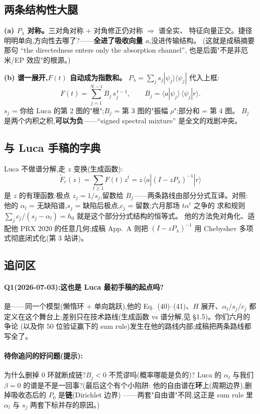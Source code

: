 \documentclass[11pt]{article}
\newcommand{\ket}[1]{|#1\rangle}
\newcommand{\bra}[1]{\langle#1|}
\begin{document}
\subsection{两条结构性大腿}
\textbf{(a) $P_\lambda$ 对称。}三对角对称 $+$ 对角修正仍对称 $\Rightarrow$ 谱全实、
特征向量正交。捷径明明单向,方向性去哪了?——\textbf{全进了吸收向量 $a$},没进传输结构。
(这就是成稿摘要那句 ``the directedness enters only the absorption channel'',
也是后面"不是非厄米/EP 效应"的根源。)

\textbf{(b) 谱一展开,$F(t)$ 自动成为指数和。}
$P_\lambda=\sum_j s_j\ket{\psi_j}\!\bra{\psi_j}$ 代入上框:
\[
F(t)=\sum_{j=1}^{N-1}B_j\,s_j^{\,t-1},\qquad
B_j=\langle a|\psi_j\rangle\,\langle\psi_j|r\rangle .
\]
$s_j$ = 你给 Luca 的第 2 图的"根";$B_j$ = 第 3 图的"振幅 $\rho$";部分和 = 第 4 图。
$B_j$ 是两个内积之积,\textbf{可以为负}——``signed spectral mixture'' 是全文的戏剧冲突。

\subsection{与 Luca 手稿的字典}
Luca 不做谱分解,走 $z$ 变换(生成函数):
\[
\tilde F_r(z)=\sum_{t\ge1}F(t)z^t=z\,\bra{a}(I-zP_\lambda)^{-1}\ket{r}
\]
是 $z$ 的有理函数:极点 $z_j=1/s_j$,留数给 $B_j$——两条路线由部分分式互译。对照:
他的 $\alpha_l$ = 无缺陷谱,$s_j$ = 缺陷后极点,$c_j$ = 留数;六月那场 $t\alpha^t$ 之争的
求和规则 $\sum_j c_j/(s_j-\alpha_l)=h_0$ 就是这个部分分式结构的恒等式。
他的方法免对角化、适配他 PRX 2020 的任意几何;成稿 App.~A 则把
$(I-zP_\lambda)^{-1}$ 用 Chebyshev 多项式彻底闭式化(第 3 站讲)。

\subsection{追问区}
\paragraph{Q1(2026-07-03):这也是 Luca 最初手稿的起点吗?}
是——同一个模型(懒惰环 + 单向跳跃),他的 Eq.~(40)--(41)、$H$ 展开、$\alpha_l/s_j/c_j$
都定义在这个舞台上;差别只在技术路线(生成函数 vs 谱分解,见 \S1.5)。你们六月的争论
(以及你 50 位验证赢下的 sum rule)发生在他的路线内部;成稿把两条路线都写全了。

\paragraph{待你追问的好问题(提示):}
为什么删掉 0 环就断成链?$B_j<0$ 不荒谬吗(概率哪能是负的)?
Luca 的 $\alpha_l$ 与我们 $\beta=0$ 的谱是不是一回事?(最后这个有个小陷阱:
他的自由谱在\textbf{环}上(周期边界),删掉吸收态后的 $P_0$ 是\textbf{链}(Dirichlet 边界)
——两套"自由谱"不同,这正是 sum rule 里 $\alpha_l$ 与 $s_j$ 两套下标并存的原因。)
\end{document}
